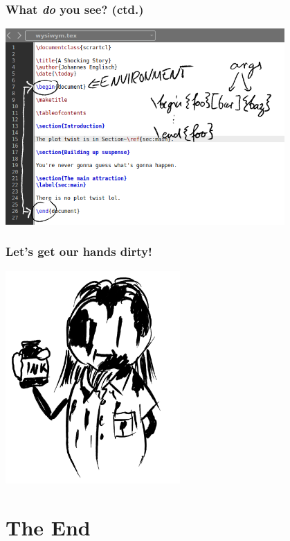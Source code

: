 \documentclass[a4paper,12pt]{beamer}
\begin{document}
\begin{frame}
  \frametitle{What \emph{do} you see? (ctd.)}

  \begin{center}
    \includegraphics[width=0.8\textwidth]{images/environment.png}
  \end{center}
\end{frame}

\begin{frame}
  \frametitle{Let's get our hands dirty!}

  \begin{center}
    \includegraphics[width=0.5\textwidth]{images/dirty.png}
  \end{center}
\end{frame}

\section{The End}
\end{document}
